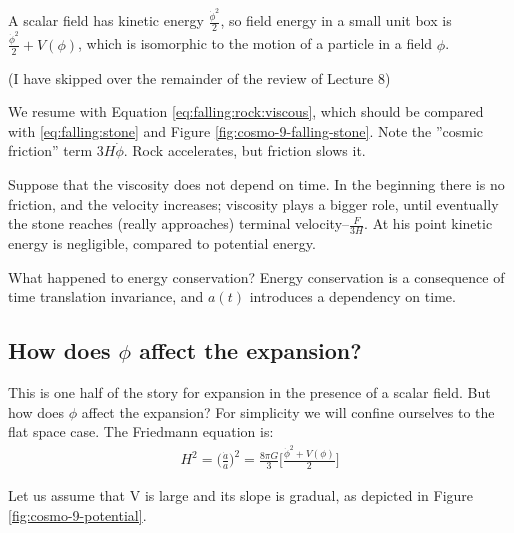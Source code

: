 \documentclass[]{article}
\begin{document}
A scalar field has kinetic energy $\frac{\dot{\phi}^2}{2}$, so field energy in a small unit box is $\frac{\dot{\phi}^2}{2} + V(\phi)$, which is isomorphic to the motion of a particle in a field $\phi$.

(I have skipped over the remainder of the review of Lecture 8)

We resume with Equation \eqref{eq:falling:rock:viscous}, which should be compared with \eqref{eq:falling:stone} and Figure \ref{fig:cosmo-9-falling-stone}. Note the ''cosmic friction'' term $3H\dot{\phi}$. Rock accelerates, but friction slows it.

Suppose that the viscosity does not depend on time. In the beginning there is no friction, and the velocity increases; viscosity plays a bigger role, until eventually the stone reaches (really approaches) terminal velocity--$\frac{F}{3H}$. At his point kinetic energy is negligible, compared to potential energy.

What happened to energy conservation? Energy conservation is a consequence of time translation invariance, and $a(t)$ introduces a dependency on time.

\subsection{How does $\phi$ affect the expansion?}
This is one half of the story for expansion in the presence of a scalar field. But how does $\phi$ affect the expansion? For simplicity we will confine ourselves to the flat space case. The Friedmann equation is:
\begin{align*}
	H^2 = \big(\frac{\dot{a}}{a}\big)^2 = \frac{8\pi G}{3}\big[\frac{\dot{\phi}^2+V(\phi)}{2}\big]
\end{align*}

Let us assume that V is large and its slope is gradual, as depicted in Figure \ref{fig:cosmo-9-potential}.
\end{document}
